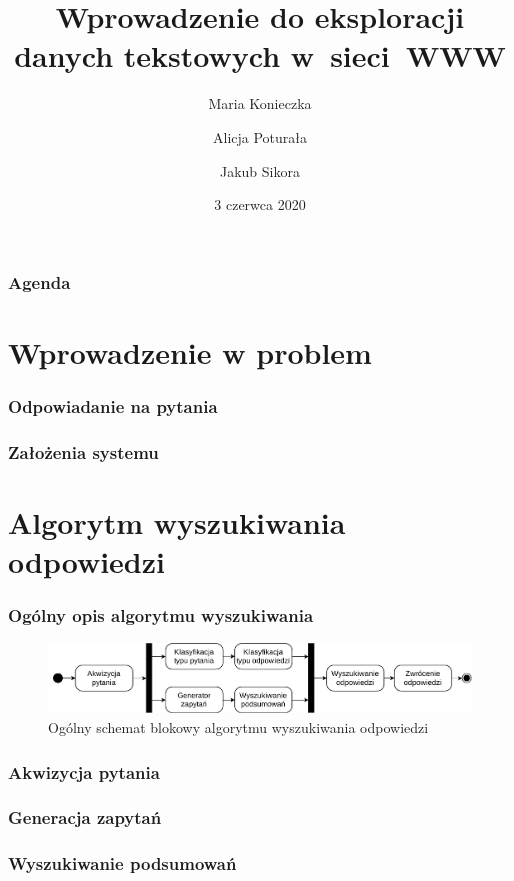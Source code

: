 \documentclass{beamer}
\title[WEDT - Projekt]{Wprowadzenie do eksploracji danych tekstowych w~sieci~WWW}
\author[Konieczka, Poturała, Sikora]{Maria Konieczka \and Alicja Poturała \and Jakub Sikora}
\date{3 czerwca 2020}
\institute[]{Odpowiadanie na pytania ogólne zadane w~języku polskim}
\begin{document}
\begin{frame}
\titlepage
\end{frame}

\begin{frame}
  \frametitle{Agenda}
  \tableofcontents
\end{frame}

\section{Wprowadzenie w problem}

\begin{frame}
  \frametitle{Odpowiadanie na pytania}

\end{frame}

\begin{frame}
  \frametitle{Założenia systemu}

\end{frame}

\section{Algorytm wyszukiwania odpowiedzi}
\begin{frame}
  \frametitle{Ogólny opis algorytmu wyszukiwania}
  \bigskip
  \begin{figure}
    \centering
    \includegraphics[width=\columnwidth]{figures/WEDT-Algorytm-Rotated.pdf}
    \caption{Ogólny schemat blokowy algorytmu wyszukiwania odpowiedzi}
    \label{fig:ir-algorytm}
  \end{figure}
\end{frame}

\begin{frame}
  \frametitle{Akwizycja pytania}

\end{frame}

\begin{frame}
  \frametitle{Generacja zapytań}

\end{frame}

\begin{frame}
  \frametitle{Wyszukiwanie podsumowań}

\end{frame}
\end{document}
